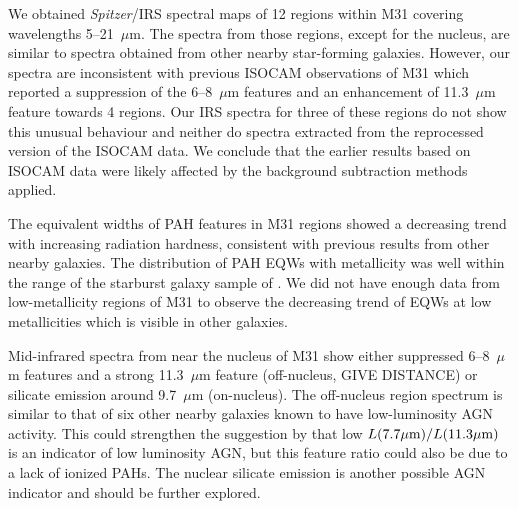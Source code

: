 We  obtained {\em Spitzer}/IRS spectral maps of 12 regions within M31 covering wavelengths 5--21~$\mu$m. 
The spectra from those regions, except for the nucleus, are similar to spectra obtained from other nearby  star-forming galaxies. 
However, our spectra are inconsistent with previous ISOCAM observations of M31 \citep{1998Cesarsky} which reported a suppression 
of the 6--8~$\mu$m features and an enhancement of 11.3~$\mu$m feature towards 4 regions. 
Our IRS spectra for three of these regions do not show this unusual behaviour and neither do spectra extracted from the reprocessed version
of the ISOCAM data.
We conclude that the earlier results based on ISOCAM data were likely affected by the background subtraction methods applied.

The equivalent widths of PAH features in M31 regions showed a decreasing trend with increasing radiation hardness, consistent with previous 
results from other nearby galaxies. The distribution of PAH EQWs with metallicity was well within the range of the starburst galaxy sample of \citet{Engelbracht_2008}. 
We did not have enough data from low-metallicity regions of M31 to observe the decreasing trend of EQWs at low metallicities which is visible in other galaxies.

Mid-infrared spectra from near the nucleus of M31 show either suppressed 6--8~$\mu$m features and a strong 11.3~$\mu$m feature
(off-nucleus, GIVE DISTANCE) or silicate emission around 9.7~$\mu$m  (on-nucleus). The off-nucleus region spectrum is similar to that of
six other nearby galaxies known to have low-luminosity AGN activity. This could strengthen the
suggestion by \citet{Smith:2007lr} that low $L(7.7\mu{\rm m})/L(11.3\mu{\rm m})$ is an indicator of low luminosity AGN,
but this feature ratio could also be due to a lack of ionized PAHs. The nuclear silicate emission is another possible AGN indicator
and should be further explored. %
 